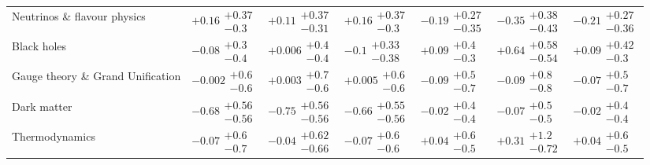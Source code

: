 \begin{table}[H]
\begin{tabular}{lllllll}
Neutrinos \& flavour physics              &        $+0.16\substack{+0.37 \\ -0.3}$ &       $+0.11\substack{+0.37 \\ -0.31}$ &        $+0.16\substack{+0.37 \\ -0.3}$ &       $-0.19\substack{+0.27 \\ -0.35}$ &       $-0.35\substack{+0.38 \\ -0.43}$ &       $-0.21\substack{+0.27 \\ -0.36}$ \\
Black holes                               &         $-0.08\substack{+0.3 \\ -0.4}$ &        $+0.006\substack{+0.4 \\ -0.4}$ &        $-0.1\substack{+0.33 \\ -0.38}$ &         $+0.09\substack{+0.4 \\ -0.3}$ &  $\bm{+0.64}\substack{+0.58 \\ -0.54}$ &        $+0.09\substack{+0.42 \\ -0.3}$ \\
Gauge theory \& Grand Unification         &        $-0.002\substack{+0.6 \\ -0.6}$ &        $+0.003\substack{+0.7 \\ -0.6}$ &        $+0.005\substack{+0.6 \\ -0.6}$ &         $-0.09\substack{+0.5 \\ -0.7}$ &         $-0.09\substack{+0.8 \\ -0.8}$ &         $-0.07\substack{+0.5 \\ -0.7}$ \\
Dark matter                               &  $\bm{-0.68}\substack{+0.56 \\ -0.56}$ &  $\bm{-0.75}\substack{+0.56 \\ -0.56}$ &  $\bm{-0.66}\substack{+0.55 \\ -0.56}$ &         $-0.02\substack{+0.4 \\ -0.4}$ &         $-0.07\substack{+0.5 \\ -0.5}$ &         $-0.02\substack{+0.4 \\ -0.4}$ \\
Thermodynamics                            &         $-0.07\substack{+0.6 \\ -0.7}$ &       $-0.04\substack{+0.62 \\ -0.66}$ &         $-0.07\substack{+0.6 \\ -0.6}$ &         $+0.04\substack{+0.6 \\ -0.5}$ &        $+0.31\substack{+1.2 \\ -0.72}$ &         $+0.04\substack{+0.6 \\ -0.5}$ \\

\end{tabular}
\end{table}

